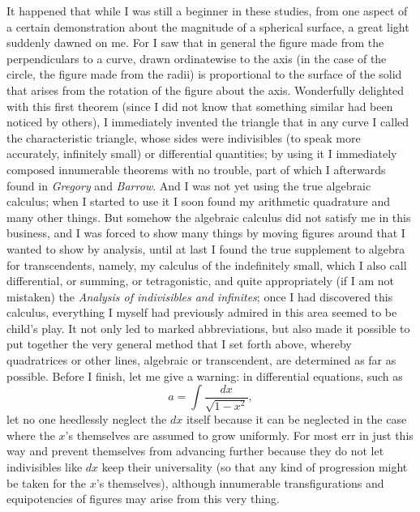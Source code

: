 \documentclass[polutonikogreek,english,twoside,openright]{article}
\begin{document}
It happened that while I was still a beginner in these studies, from
one aspect of a certain demonstration about the magnitude of a
spherical surface, a great light suddenly dawned on me. For I saw that
in general the figure made from the perpendiculars to a curve, drawn
ordinatewise to the axis (in the case of the circle, the figure made
from the radii) is proportional to the surface of the solid that
arises from the rotation of the figure about the axis. Wonderfully delighted with this first
theorem (since I did not know that something similar had been noticed
by others), I immediately invented the triangle that in any curve I
called the characteristic triangle, whose sides were indivisibles (to
speak more accurately, infinitely small) or differential quantities;
by using it I immediately composed innumerable theorems with no
trouble, part of which I afterwards found in {\em Gregory} and {\em
  Barrow}.  And I was not yet using the true algebraic calculus; when
I started to use it I soon found my arithmetic quadrature and many
other things.  But somehow the algebraic calculus did not satisfy me
in this business, and I was forced to show many things by moving
figures around that I wanted to show by analysis, until at last I
found the true supplement to algebra for transcendents, namely, my
calculus of the indefinitely small, which I also call differential, or
summing, or tetragonistic, and quite appropriately (if I am not
mistaken) the {\em Analysis of indivisibles and infinites}; once I had
discovered this calculus, everything I myself had previously admired
in this area seemed to be child's play.  It not only led to marked
abbreviations, but also made it possible to put together the very
general method that I set forth above, whereby quadratrices or other
lines, algebraic or transcendent,\label{quadothalg} are determined as
far as possible.  Before I finish, let me give a warning: in
differential equations, such as
$$a= \int\!\frac{dx}{\sqrt{1-x^2}},$$\label{rgcircarc}%
let no one heedlessly neglect the $dx$ itself because it can be
neglected in the case where the $x$'s themselves are assumed to grow
uniformly.  For most err in just this way and prevent themselves from
advancing further because they do not let indivisibles like $dx$ keep
their universality (so that any kind of progression might be taken for
the $x$'s themselves), although innumerable transfigurations and
equipotencies of figures may arise from this very
thing.
\end{document}
